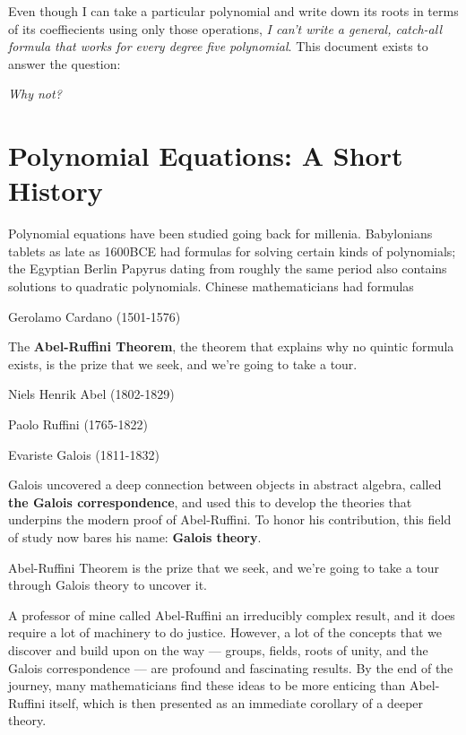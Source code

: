 Even though I can take a particular polynomial and write down its roots in terms of its coeffiecients using only those operations, \textit{I can't write a general, catch-all formula that works for every degree five polynomial}. This document exists to answer the question:

\begin{center}
    \Huge \textit{ Why not?}
\end{center}

\section{Polynomial Equations: A Short History}

Polynomial equations have been studied going back for millenia. Babylonians tablets as late as 1600BCE had formulas for solving certain kinds of polynomials; the Egyptian Berlin Papyrus dating from roughly the same period also contains solutions to quadratic polynomials. Chinese mathematicians had formulas

Gerolamo Cardano (1501-1576)

The \textbf{Abel-Ruffini Theorem}, the theorem that explains why no quintic formula exists, is the prize that we seek, and we're going to take a tour.

Niels Henrik Abel (1802-1829)

Paolo Ruffini (1765-1822)

Evariste Galois (1811-1832)

Galois uncovered a deep connection between objects in abstract algebra, called \textbf{the Galois correspondence}, and used this to develop the theories that underpins the modern proof of Abel-Ruffini. To honor his contribution, this field of study now bares his name: \textbf{Galois theory}.




Abel-Ruffini Theorem is the prize that we seek, and we're going to take a tour through Galois theory to uncover it.

A professor of mine called Abel-Ruffini an irreducibly complex result, and it does require a lot of machinery to do justice. However, a lot of the concepts that we discover and build upon on the way --- groups, fields, roots of unity, and the Galois correspondence --- are profound and fascinating results. By the end of the journey, many mathematicians find these ideas to be more enticing than Abel-Ruffini itself, which is then presented as an immediate corollary of a deeper theory.

